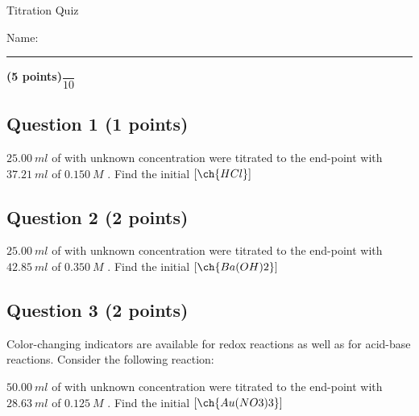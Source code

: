 \documentclass[12pt, letterpaper]{memoir}
\begin{document}
	\begin{center}
		{\large Titration Quiz}
	\end{center}
	{\large Name: \rule[-1mm]{4in}{.1pt} {\bfseries (5 points)}\hspace{4em}$\dfrac{~}{10}$} 
	
	\subsection*{Question 1 (1 points)}
	$25.00~ml$ of  with unknown concentration were titrated to the end-point with $37.21~ml$ of $0.150~M$ . Find the initial $\left[\ch{HCl}\right]$
	
	\vspace{9em}
	\subsection*{Question 2 (2 points)}
	$25.00~ml$ of  with unknown concentration were titrated to the end-point with $42.85~ml$ of $0.350~M$ . Find the initial $\left[\ch{Ba(OH)2}\right]$
	
	\vspace{10em}
	\subsection*{Question 3 (2 points)}
	Color-changing indicators are available for redox reactions as well as for acid-base reactions. Consider the following reaction:
	
	
	\noindent $50.00~ml$ of  with unknown concentration were titrated to the end-point with $28.63~ml$ of $0.125~M$ . Find the initial $\left[\ch{Au(NO3)3}\right]$
\end{document}

